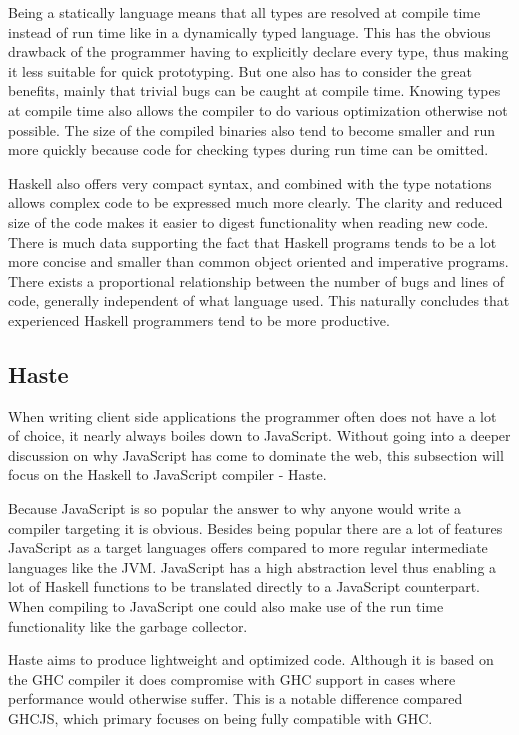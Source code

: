 \documentclass[a4paper]{article}
\begin{document}
Being a statically language means that all types are resolved at compile time instead of run time like in a dynamically typed language. This has the obvious drawback of the programmer having to explicitly declare every type, thus making it less suitable for quick prototyping. But one also has to consider the great benefits, mainly that trivial bugs can be caught at compile time. Knowing types at compile time also allows the compiler to do various optimization otherwise not possible. The size of the compiled binaries also tend to become smaller and run more quickly because code for checking types during run time can be omitted. 

Haskell also offers very compact syntax, and combined with the type notations allows complex code to be expressed much more clearly. The clarity and reduced size of the code makes it easier to digest functionality when reading new code. There is much data supporting the fact that Haskell programs tends to be a lot more concise and smaller than common object oriented and imperative programs. There exists a proportional relationship between the number of bugs and lines of code, generally independent of what language used. This naturally concludes that experienced Haskell programmers tend to be more productive.



\subsection{Haste}
When writing client side applications the programmer often does not have a lot of choice, it nearly always boiles down to JavaScript. Without going into a deeper discussion on why JavaScript has come to dominate the web, this subsection will focus on the Haskell to JavaScript compiler - Haste.

Because JavaScript is so popular the answer to why anyone would write a compiler targeting it is obvious. Besides being popular there are a lot of features JavaScript as a target languages offers compared to more regular
intermediate languages like the JVM. JavaScript has a high abstraction level thus enabling a lot of Haskell functions to be translated directly to a JavaScript counterpart. When compiling to JavaScript one could also make use 
of the run time functionality like the garbage collector. 

Haste aims to produce lightweight and optimized code. Although it is based 
on the GHC compiler it does compromise with GHC support in cases where performance would otherwise suffer. This is a notable
difference compared GHCJS, which primary focuses on being fully compatible with GHC. 
\end{document}
